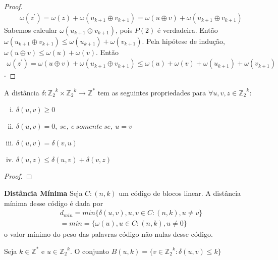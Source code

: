 \begin{proof}
\begin{align*}
\omega (z^{'})=\omega(z)+\omega(u_{k+1} \oplus v_{k+1})=\omega(u \oplus v)+\omega(u_{k+1} \oplus v_{k+1})
\end{align*}
Sabemos calcular $\omega(u_{k+1} \oplus v_{k+1})$, pois $P(2)$ é verdadeira. Então $\omega(u_{k+1} \oplus v_{k+1}) \leq \omega(u_{k+1})+\omega(v_{k+1})$. Pela hipótese de indução, $\omega(u \oplus v) \leq \omega(u) + \omega(v)$. Então
\begin{align*}
\omega (z^{'}) =\omega(u \oplus v)+\omega(u_{k+1} \oplus v_{k+1}) \leq \omega(u) + \omega(v) + \omega(u_{k+1})+ \omega(v_{k+1})
\end{align*}
$\square$
\end{proof}

\begin{proposition} A distância $\delta : {\mathbb{Z}_2}^k \times {\mathbb{Z}_2}^k \rightarrow {\mathbb{Z}}^*$ tem as seguintes propriedades para $\forall u,v,z \in {\mathbb{Z}_2}^k$:
  \begin{enumerate}[(i)]
     \item $\delta(u,v) \geq 0$
     \item $\delta(u,v)=0,\ se,\ e\ somente\ se,\ u=v$
     \item $\delta(u,v)=\delta(v,u)$
     \item $\delta(u,z) \leq \delta(u,v) + \delta(v,z)$
  \end{enumerate}
\end{proposition}

\begin{proof}
\end{proof}

\begin{definition} {\bf Distância Mínima} \label{DistMin}  Seja $C:(n,k)$ um código de blocos linear. A  distância mínima
desse código é dada por 
\begin{align*}
d_{min} = min \{ \delta(u,v), u,v \in C:(n,k), u \neq v \}\\
= min= \{ \omega(u), u \in C:(n,k), u \neq 0 \}
\end{align*}
o valor mínimo do peso das palavras código não nulas desse código.

\end{definition}

\begin{definition} Seja $k \in {\mathbb{Z}}^*$ e $u \in {\mathbb{Z}_2}^k$. O conjunto $B(u,k)=\{ v \in {\mathbb{Z}_2}^k : \delta(u,v) \leq k\}$
\end{definition}


